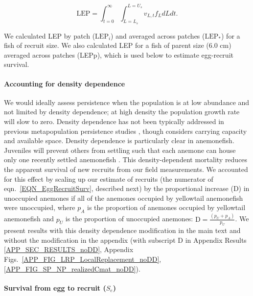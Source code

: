 \documentclass[12pt, oneside]{article}   	%
\begin{document}
\begin{equation}
\text{LEP} = \int_{t=0}^{\infty}\int_{L=L_s}^{L=U_s} v_{L,t} f_L dL dt. \label{EQN_LEP}
\end{equation}

We calculated LEP by patch ($\text{LEP}_i$) and averaged across patches ($\text{LEP}_*$) for a fish of recruit size. We also calculated LEP for a fish of parent size (6.0 cm) averaged across patches (LEPp), which is used below to estimate egg-recruit survival.

\paragraph*{Accounting for density dependence}  %

We would ideally assess persistence when the population is at low abundance and not limited by density dependence; at high density the population growth rate will slow to zero. Density dependence has not been typically addressed in previous metapopulation persistence studies \citep{johnson2018integrating, carson2011evaluating, hameed2016inverse}, though \cite{salles_coral_2015} considers carrying capacity and available space. Density dependence is particularly clear in anemonefish. Juveniles will prevent others from settling such that each anemone can house only one recently settled anemonefish \citep{buston2003forcible}. This density-dependent mortality reduces the apparent survival of new recruits from our field measurements. We accounted for this effect by scaling up our estimate of recruits (the numerator of eqn.\ \ref{EQN_EggRecruitSurv}, described next) by the proportional increase ($\text{D}$) in unoccupied anemones if all of the anemones occupied by yellowtail anemonefish were unoccupied, where $p_A$ is the proportion of anemones occupied by yellowtail anemonefish and $p_U$ is the proportion of unoccupied anemones: $\text{D} = \frac{(p_U + p_A)}{p_U}$. We present results with this density dependence modification in the main text and without the modification in the appendix (with subscript D in Appendix Results \ref{APP_SEC_RESULTS_noDD}, Appendix Figs.\ \ref{APP_FIG_LRP_LocalReplacement_noDD}, \ref{APP_FIG_SP_NP_realizedCmat_noDD}). %

\paragraph*{Survival from egg to recruit ($S_e$)}
\end{document}
